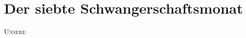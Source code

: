 

\chapter*{Der siebte Schwangerschaftsmonat}

\lettrine[lines=2, loversize=0.3, lraise=0]{\initfamily U}{nsere}
